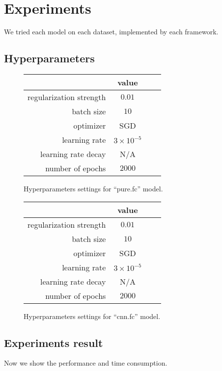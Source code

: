 \documentclass[a4paper]{article}
\begin{document}
\section{Experiments}

We tried each model on each dataset, implemented by each framework.

\subsection{Hyperparameters}

\begin{figure}[H]
\centering
\begin{tabular}{|r|c|c|c|}
\hline
 & value \\
\hline
regularization strength & $0.01$ \\
\hline
batch size & $10$ \\
\hline
optimizer & SGD \\
\hline
learning rate & $3\times10^{-5}$\\
\hline
learning rate decay & N/A \\
\hline
number of epochs & $2000$ \\
\hline
\end{tabular}
\caption{Hyperparameters settings for ``pure.fc'' model.}
\end{figure}

\begin{figure}[H]
\centering
\begin{tabular}{|r|c|c|c|}
\hline
 & value \\
\hline
regularization strength & $0.01$ \\
\hline
batch size & $10$ \\
\hline
optimizer & SGD \\
\hline
learning rate & $3\times10^{-5}$\\
\hline
learning rate decay & N/A \\
\hline
number of epochs & $2000$ \\
\hline
\end{tabular}
\caption{Hyperparameters settings for ``cnn.fc'' model.}
\end{figure}

\subsection{Experiments result}

Now we show the performance and time consumption.
\end{document}
